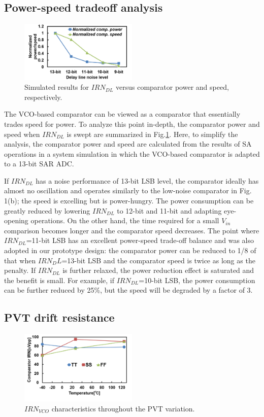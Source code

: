\documentclass[journal]{IEEEtran}
\begin{document}
\subsection{Power-speed tradeoff analysis}
\begin{figure}[!]
\centering
 \includegraphics[width=0.5\textwidth]{figs/comp_anal.png}
  \caption{Simulated results for $IRN_{DL}$ versus comparator power and speed, respectively.}
  \label{comp-anal}
\end{figure}
The VCO-based comparator can be viewed as a comparator that essentially trades speed for power.
To analyze this point in-depth, the comparator power and speed when $IRN_{DL}$ is swept are summarized in Fig.\ref{comp-anal}.
Here, to simplify the analysis, the comparator power and speed are calculated from the results of SA operations in a system simulation in which the VCO-based comparator is adapted to a 13-bit SAR ADC.

If $IRN_{DL}$ has a noise performance of 13-bit LSB level, the comparator ideally has almost no oscillation and operates similarly to the low-noise comparator in Fig. 1(b); the speed is excelling but is power-hungry. The power consumption can be greatly reduced by lowering $IRN_{DL}$ to 12-bit and 11-bit and adapting eye-opening operations. On the other hand, the time required for a small $V_{in}$ comparison becomes longer and the comparator speed decreases. The point where $IRN_{DL}$=11-bit LSB has an excellent power-speed trade-off balance and was also adopted in our prototype design: the comparator power can be reduced to 1/8 of that when $IRN_DL$=13-bit LSB and the comparator speed is twice as long as the penalty. If $IRN_{DL}$ is further relaxed, the power reduction effect is saturated and the benefit is small. For example, if $IRN_{DL}$=10-bit LSB, the power consumption can be further reduced by 25\%, but the speed will be degraded by a factor of 3.

\subsection{PVT drift resistance}
\begin{figure}[ht!]
\centering
 \includegraphics[width=0.5\textwidth]{figs/pvt_vco.png}
  \caption{$IRN_{VCO}$ characteristics throughout the PVT variation.}
  \label{pvtvco}
\end{figure}
\end{document}
